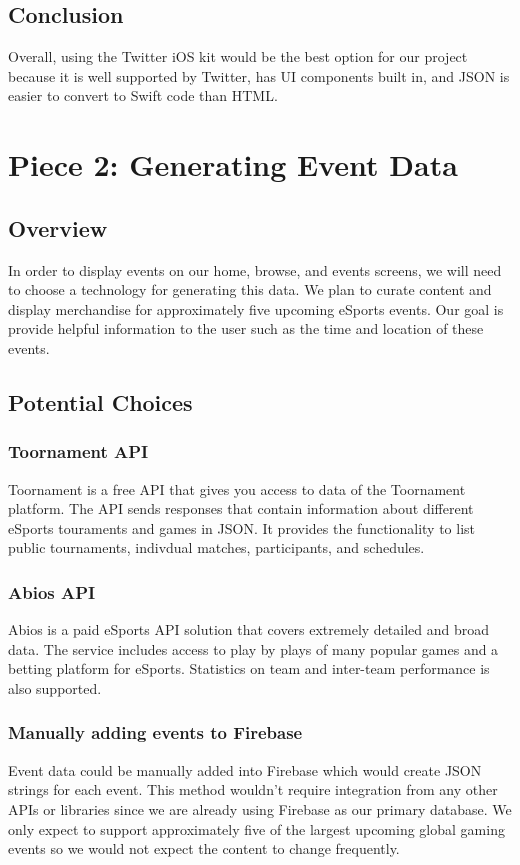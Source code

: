 \documentclass[onecolumn, draftclsnofoot,10pt, compsoc]{IEEEtran}
\begin{document}
\subsection{Conclusion}
Overall, using the Twitter iOS kit would be the best option for our project because it is well supported by Twitter, has UI components built in, and JSON is easier to convert to Swift code than HTML.

\section{Piece 2: Generating Event Data}
\subsection{Overview}
In order to display events on our home, browse, and events screens, we will need to choose a technology for generating this data. 
We plan to curate content and display merchandise for approximately five upcoming eSports events.
Our goal is provide helpful information to the user such as the time and location of these events. 
\subsection{Potential Choices}
\subsubsection{Toornament API\cite{toornament}}
Toornament is a free API that gives you access to data of the Toornament platform.
The API sends responses that contain information about different eSports touraments and games in JSON.
It provides the functionality to list public tournaments, indivdual matches, participants, and schedules. 
\subsubsection{Abios API\cite{abios}}
Abios is a paid eSports API solution that covers extremely detailed and broad data. 
The service includes access to play by plays of many popular games and a betting platform for eSports.
Statistics on team and inter-team performance is also supported. 
\subsubsection{Manually adding events to Firebase\cite{fb}}
Event data could be manually added into Firebase which would create JSON strings for each event.
This method wouldn't require integration from any other APIs or libraries since we are already using Firebase as our primary database.
We only expect to support approximately five of the largest upcoming global gaming events so we would not expect the content to change frequently. 
\end{document}
